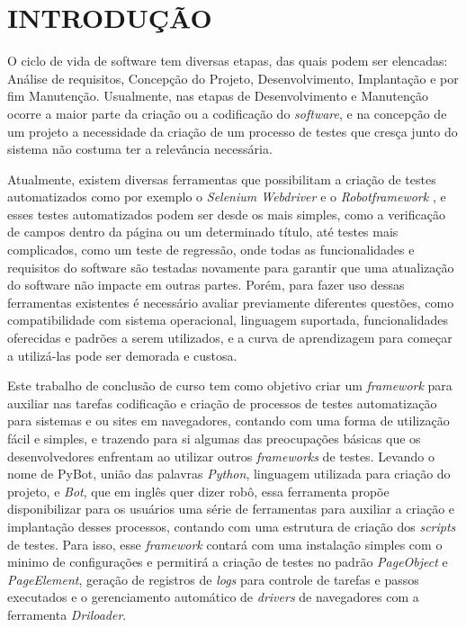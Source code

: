 %
%

\chapter{INTRODUÇÃO}\label{chap:introducao}

    O ciclo de vida de software tem diversas etapas, das quais podem ser elencadas: Análise de requisitos, Concepção do Projeto, Desenvolvimento,
    Implantação e por fim Manutenção. Usualmente, nas etapas de Desenvolvimento e Manutenção ocorre a maior parte da criação ou a codificação do
    \textit{software}, e na concepção de um projeto a necessidade da criação de um processo de testes que cresça junto do sistema não costuma ter
    a relevância necessária.

    Atualmente, existem diversas ferramentas que possibilitam a criação de testes automatizados como por exemplo o \textit{Selenium Webdriver} \cite{selenium}
    e o \textit{Robotframework} \cite{robotframework}, e esses testes automatizados podem ser desde os mais simples, como a verificação de campos dentro da página
    ou um determinado título, até testes mais complicados, como um teste de regressão, onde todas as funcionalidades e requisitos
    do software são testadas novamente para garantir que uma atualização do software não impacte em outras partes. Porém, para fazer uso dessas
    ferramentas existentes é necessário avaliar previamente diferentes questões, como compatibilidade com sistema operacional, linguagem suportada,
    funcionalidades oferecidas e padrões a serem utilizados, e a curva de aprendizagem para começar a utilizá-las pode ser demorada e custosa.

    Este trabalho de conclusão de curso tem como objetivo criar um \textit{framework} para auxiliar nas tarefas codificação e criação de processos de testes automatização para
    sistemas e ou sites em navegadores, contando com uma forma de utilização fácil e simples, e trazendo para si algumas das preocupações básicas que os desenvolvedores enfrentam
    ao utilizar outros \textit{frameworks} de testes. Levando o nome de PyBot, união das palavras \textit{Python}, linguagem utilizada para criação do projeto, e \textit{Bot},
    que em inglês quer dizer robô, essa ferramenta propõe disponibilizar para os usuários uma série de ferramentas para auxiliar a criação e implantação desses processos,
    contando com uma estrutura de criação dos \textit{scripts} de testes. Para isso, esse \textit{framework} contará com uma instalação simples com o minimo de configurações e permitirá
    a criação de testes no padrão \textit{PageObject} e \textit{PageElement}, geração de registros de \textit{logs} para controle de tarefas e passos executados e o
    gerenciamento automático de \textit{drivers} de navegadores com a ferramenta \textit{Driloader}.

